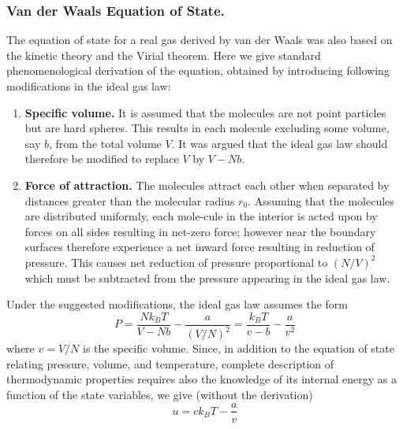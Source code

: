 \documentclass[../../../Main.tex]{subfiles}
\begin{document}
\subsubsection*{Van der Waals Equation of State.} The equation of state for a real gas derived by van der Waals was also based on the kinetic theory and the Virial theorem. Here we give standard phenomenological derivation of the equation, obtained by introducing following modifications in the ideal gas law:
\begin{enumerate}
    \item \textbf{Specific volume.} It is assumed that the molecules are not point particles but are hard spheres. This results in each molecule excluding some volume, say $b$, from the total volume $V$. It was argued that the ideal gas law should therefore be modified to replace $V$ by $V - N b$.
    \item \textbf{Force of attraction.} The molecules attract each other when separated by distances greater than the molecular radius $r_0$. Assuming that the molecules are distributed uniformly, each mole-cule in the interior is acted upon by forces on all sides resulting in net-zero force; however near the boundary surfaces therefore experience a net inward force resulting in reduction of pressure. This causes net reduction of pressure proportional to $(N /V )^2$ which must be subtracted from the pressure appearing in the ideal gas law.
\end{enumerate}
Under the suggested modifications, the ideal gas law assumes the form
\begin{equation*}
    P=\frac{Nk_B T}{V-Nb}-\frac{a}{(V/N)^2}=\frac{k_BT}{v-b}- \frac{a}{v^2}
\end{equation*}
where $v=V/N$ is the specific volume. Since, in addition to the equation of state relating pressure, volume, and temperature, complete description of thermodynamic properties requires also the knowledge of its internal energy as a function of the state variables, we give (without the derivation)
\begin{equation*}
    u=ck_BT-\frac{a}{v}
\end{equation*}
\end{document}
